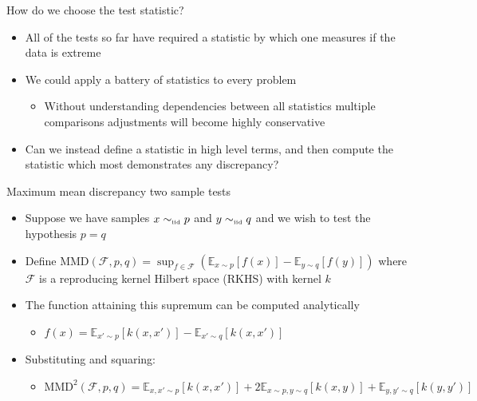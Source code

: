 \begin{frame}{How do we choose the test statistic?}
  \begin{itemize}
    \item All of the tests so far have required a statistic by which one measures if the data is extreme
    \vspace{\baselineskip}
    \pause
    \item We could apply a battery of statistics to every problem
    \begin{itemize}
      \item Without understanding dependencies between all statistics multiple comparisons adjustments will become highly conservative
    \end{itemize}
    \vspace{\baselineskip}
    \pause
    \item Can we instead define a statistic in high level terms, and then compute the statistic which most demonstrates any discrepancy?
  \end{itemize}
\end{frame}

\begin{frame}{Maximum mean discrepancy two sample tests}
  \begin{itemize}
    \item Suppose we have samples $x \sim_{\mbox{\tiny iid}} p$ and $y \sim_{\mbox{\tiny iid}} q$ and we wish to test the hypothesis $p = q$
    \vspace{\baselineskip}
    \pause
    \item Define $\textrm{MMD}(\mathcal{F},p,q) = \sup_{f \in \mathcal{F}}(\mathbb{E}_{x\sim p}[f(x)] - \mathbb{E}_{y\sim q}[f(y)])$ where $\mathcal{F}$ is a reproducing kernel Hilbert space (RKHS) with kernel $k$
    \vspace{\baselineskip}
    \pause
    \item The function attaining this supremum can be computed analytically
    \begin{itemize}
      \item $f(x) = \mathbb{E}_{x'\sim p}[k(x,x')] - \mathbb{E}_{x'\sim q}[k(x,x')]$
    \end{itemize}
    \vspace{\baselineskip}
    \pause
    \item Substituting and squaring:
    \begin{itemize}
		\item $\textrm{MMD}^2(\mathcal{F},p,q) = \mathbb{E}_{x,x'\sim p}[k(x,x')] + 2\mathbb{E}_{x\sim p,y\sim q}[k(x,y)] + \mathbb{E}_{y,y'\sim q}[k(y,y')]$
	\end{itemize}
  \end{itemize}
\end{frame}

